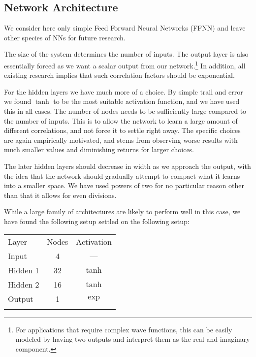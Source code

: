 \documentclass[Thesis.tex]{subfiles}
\begin{document}
\subsection{Network Architecture}

We consider here only simple Feed Forward Neural Networks (FFNN) and leave other
species of NNs for future research.

The size of the system determines the number of inputs.
The output layer is also essentially forced as we want a
scalar output from our network.\footnote{For applications that require complex
  wave functions, this can be easily modeled by having two outputs and
  interpret them as the real and imaginary component.} In addition, all
existing research implies that such correlation factors should be exponential.

For the hidden layers we have much more of a choice. By simple trail and error
we found $\tanh$ to be the most suitable activation function, and we have used this
in all cases. The number of nodes needs to be sufficiently large compared to the
number of inputs. This is to allow the network to learn a large amount of
different correlations, and not force it to settle right away.
The specific choices are again empirically motivated, and stems
from observing worse results with much smaller values and diminishing returns
for larger choices.

The later hidden layers should decrease in width as we approach the output, with
the idea that the network should gradually attempt to compact what it learns
into a smaller space. We have used powers of two for no particular reason other
than that it allows for even divisions.

While a large family of architectures are likely to perform well in this case,
we have found the following setup settled on the following setup:

\begin{center}
  \begin{tabular}{lcc}
    \toprule
    \addlinespace
    Layer & Nodes & Activation\\
    \addlinespace
    \midrule
    \addlinespace
    \addlinespace
    Input & 4 & ---\\
    Hidden 1& 32 & $\tanh$\\
    Hidden 2& 16 & $\tanh$\\
    Output & 1 & $\exp$\\
    \addlinespace
    \addlinespace
    \bottomrule
  \end{tabular}
\end{center}
\end{document}
